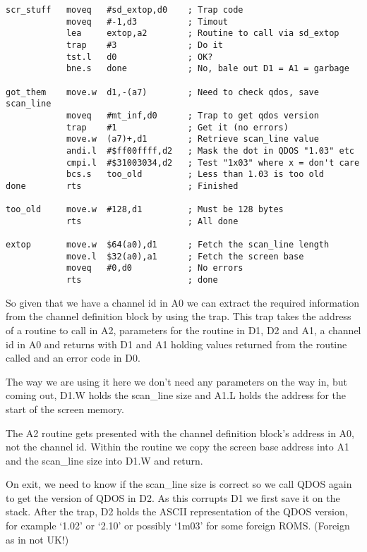\begin{lstlisting}[firstnumber=1,caption={Obtaining the Screen Address with SD\_EXTOP},label={lst:ObtainingTheScreenAddressWithSdextop}]
scr_stuff   moveq   #sd_extop,d0    ; Trap code
            moveq   #-1,d3          ; Timout
            lea     extop,a2        ; Routine to call via sd_extop
            trap    #3              ; Do it
            tst.l   d0              ; OK?
            bne.s   done            ; No, bale out D1 = A1 = garbage

got_them    move.w  d1,-(a7)        ; Need to check qdos, save scan_line
            moveq   #mt_inf,d0      ; Trap to get qdos version
            trap    #1              ; Get it (no errors)
            move.w  (a7)+,d1        ; Retrieve scan_line value
            andi.l  #$ff00ffff,d2   ; Mask the dot in QDOS "1.03" etc
            cmpi.l  #$31003034,d2   ; Test "1x03" where x = don't care
            bcs.s   too_old         ; Less than 1.03 is too old
done        rts                     ; Finished

too_old     move.w  #128,d1         ; Must be 128 bytes
            rts                     ; All done

extop       move.w  $64(a0),d1      ; Fetch the scan_line length
            move.l  $32(a0),a1      ; Fetch the screen base
            moveq   #0,d0           ; No errors
            rts                     ; done
\end{lstlisting}

So given that we have a channel id in A0 we can extract the required
    information from the channel definition block by using the  trap.
    This trap takes the address of a routine to call in A2, parameters for the
    routine in D1, D2 and A1, a channel id in A0 and returns with D1 and A1
    holding values returned from the routine called and an error code in
    D0.

The way we are using it here we don't need any parameters on the way
    in, but coming out, D1.W holds the scan\_line size and A1.L holds the
    address for the start of the screen memory.

The A2 routine gets presented with the channel definition
    block's address in A0, not the channel id. Within the routine we copy the
    screen base address into A1 and the scan\_line size into D1.W and
    return.

On exit, we need to know if the scan\_line size is correct so we call
    QDOS again to get the version of QDOS in D2. As this corrupts D1 we first
    save it on the stack. After the trap, D2 holds the ASCII representation of
    the QDOS version, for example `1.02' or `2.10' or possibly `1m03' for some
    foreign ROMS. (Foreign as in not UK!)

